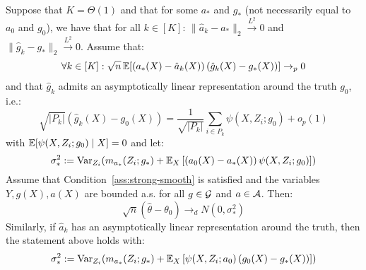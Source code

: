 \begin{lemma}\label{lem:debias-inconsistent}
Suppose that $K=\Theta(1)$ and that for some $a_*$ and $g_*$ (not necessarily equal to $a_0$ and $g_0$), we have that for all $k\in [K]$: $\|\hat{a}_k-a_*\|_2 \stackrel{L^2}{\to} 0$ and $\|\hat{g}_k-g_*\|_2\stackrel{L^2}{\to} 0$.
Assume that:
\begin{align}
    \forall k \in [K]: \sqrt{n}\, \mathbb{E}[(a_*(X) - \hat{a}_k(X))\, (\hat{g}_k(X) - g_*(X))] \rightarrow_p 0
\end{align}
and that $\hat{g}_k$ admits an asymptotically linear representation around the truth $g_0$, i.e.:
\begin{equation}
    \sqrt{|P_k|}\left(\hat{g}_k(X) - g_0(X)\right) = \frac{1}{\sqrt{|P_k|}} \sum_{i\in P_k} \psi(X, Z_i; g_0) + o_p(1)
\end{equation}
with $\mathbb{E}[\psi(X, Z_i; g_0)\mid X]=0$ and let:
\begin{equation}
    \sigma_*^2 :=\text{Var}_{Z_i}(m_{a_*}(Z_i; g_*) + \mathbb{E}_X\left[(a_0(X) - a_*(X))\,\psi(X, Z_i; g_0)\right])
\end{equation}
 Assume that Condition~\ref{ass:strong-smooth} is satisfied and the variables $Y, g(X), a(X)$ are bounded a.s. for all $g\in {\mathcal G}$ and $a\in {\mathcal A}$. Then:
\begin{equation}
    \sqrt{n}\left(\hat{\theta} - \theta_0\right) \to_d N\left(0, \sigma_*^2\right)
\end{equation}
Similarly, if $\hat{a}_k$ has an asymptotically linear representation around the truth, then the statement above holds with:
\begin{equation}
    \sigma_*^2 :=\text{Var}_{Z_i}(m_{a_*}(Z_i; g_*) + \mathbb{E}_X\left[\psi(X, Z_i; a_0)\, (g_0(X) - g_*(X))\right])
\end{equation}
\end{lemma}
